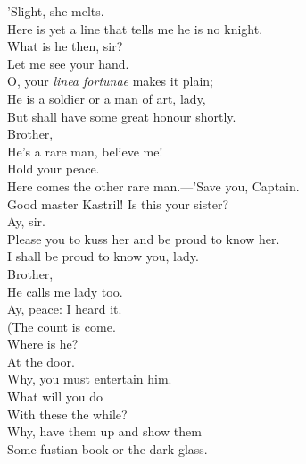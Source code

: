 \documentclass[a4paper,oneside,12pt]{memoir}
\begin{document}
\begin{drama*}
 'Slight, she melts.\\
Here is yet a line that tells me he is no knight.\\
\pliantspeaks What is he then, sir?\\
\subtlespeaks {} Let me see your hand.\\
O, your \emph{linea fortunae} makes it plain;\\
He is a soldier or a man of art, lady,\\
But shall have some great honour shortly.\\
\pliantspeaks {} Brother,\\
He's a rare man, believe me!\\
\kastrilspeaks {} Hold your peace.\\
Here comes the other rare man.---'Save you, Captain.\\
\facespeaks Good master Kastril! Is this your sister?\\
\kastrilspeaks {} Ay, sir.\\
Please you to kuss her and be proud to know her.\\
\facespeaks I shall be proud to know you, lady.\\
\pliantspeaks {} Brother,\\
He calls me lady too.\\
\kastrilspeaks {} Ay, peace: I heard it.\\
\facespeaks (The count is come.\\
\subtlespeaks {} Where is he?\\
\facespeaks {} At the door.\\
\subtlespeaks Why, you must entertain him.\\
\facespeaks {} What will you do\\
With these the while?\\
\subtlespeaks {} Why, have them up and show them\\
Some fustian book or the dark glass.\\

\end{drama*}
\end{document}
